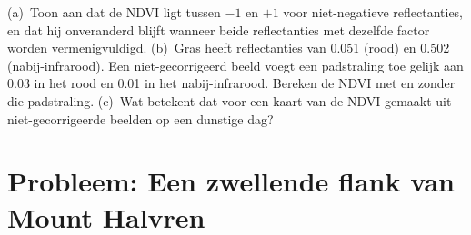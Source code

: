\begin{exercise}[$\star\star\star$]\label{exo:b3:remote-sensing-gis:12}
(a)~Toon aan dat de NDVI ligt tussen $-1$ en $+1$ voor niet-negatieve
reflectanties, en dat hij onveranderd blijft wanneer beide reflectanties
met dezelfde factor worden vermenigvuldigd. (b)~Gras heeft reflectanties van 0.051 (rood)
en 0.502 (nabij-infrarood). Een niet-gecorrigeerd beeld voegt een padstraling toe
gelijk aan 0.03 in het rood en 0.01 in het nabij-infrarood. Bereken de
NDVI met en zonder die padstraling. (c)~Wat betekent dat voor een kaart van de NDVI
gemaakt uit niet-gecorrigeerde beelden op een dunstige dag?
\end{exercise}

\section{Probleem: Een zwellende flank van Mount Halvren}


